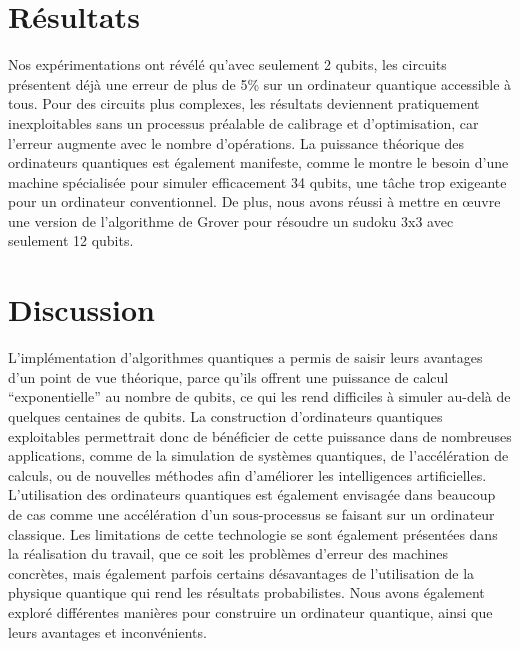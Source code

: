 \documentclass[final,5p,times,twocolumn,authoryear]{elsarticle}
\begin{document}
\section*{Résultats}

Nos expérimentations ont révélé qu'avec seulement 2 qubits, les circuits présentent déjà une erreur de plus de 5\% sur un ordinateur quantique accessible à tous. Pour des circuits plus complexes, les résultats deviennent pratiquement inexploitables sans un processus préalable de calibrage et d'optimisation, car l'erreur augmente avec le nombre d'opérations. La puissance théorique des ordinateurs quantiques est également manifeste, comme le montre le besoin d'une machine spécialisée pour simuler efficacement 34 qubits, une tâche trop exigeante pour un ordinateur conventionnel. De plus, nous avons réussi à mettre en œuvre une version de l'algorithme de Grover pour résoudre un sudoku 3x3 avec seulement 12 qubits.

\section*{Discussion}

L'implémentation d'algorithmes quantiques a permis de saisir leurs avantages d'un point de vue théorique, parce qu'ils offrent une puissance de calcul ``exponentielle'' au nombre de qubits, ce qui les rend difficiles à simuler au-delà de quelques centaines de qubits. La construction d'ordinateurs quantiques exploitables permettrait donc de bénéficier de cette puissance dans de nombreuses applications, comme de la simulation de systèmes quantiques, de l'accélération de calculs, ou de nouvelles méthodes afin d'améliorer les intelligences artificielles. L'utilisation des ordinateurs quantiques est également envisagée dans beaucoup de cas comme une accélération d'un sous-processus se faisant sur un ordinateur classique. Les limitations de cette technologie se sont également présentées dans la réalisation du travail, que ce soit les problèmes d'erreur des machines concrètes, mais également parfois certains désavantages de l'utilisation de la physique quantique qui rend les résultats probabilistes. Nous avons également exploré différentes manières pour construire un ordinateur quantique, ainsi que leurs avantages et inconvénients.
\end{document}
